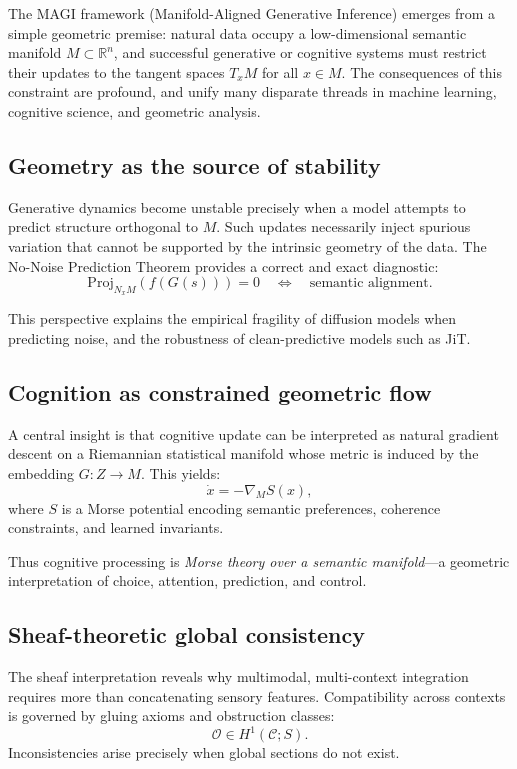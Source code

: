 \documentclass[11pt,a4paper,twocolumn]{article}
\begin{document}
The MAGI framework (Manifold-Aligned Generative Inference) emerges from
a simple geometric premise: natural data occupy a low-dimensional
semantic manifold $M \subset \mathbb{R}^n$, and successful generative or
cognitive systems must restrict their updates to the tangent spaces
$T_x M$ for all $x \in M$.  
The consequences of this constraint are profound, and unify many
disparate threads in machine learning, cognitive science, and geometric
analysis.

\subsection{Geometry as the source of stability}

Generative dynamics become unstable precisely when a model attempts to
predict structure orthogonal to $M$.  
Such updates necessarily inject spurious variation that cannot be
supported by the intrinsic geometry of the data.  
The No-Noise Prediction Theorem provides a correct and exact diagnostic:
\[
\mathrm{Proj}_{N_x M} (f(G(s))) = 0
\quad \Leftrightarrow \quad \text{semantic alignment}.
\]

This perspective explains the empirical fragility of diffusion models
when predicting noise, and the robustness of clean-predictive models
such as JiT.

\subsection{Cognition as constrained geometric flow}

A central insight is that cognitive update can be interpreted as natural
gradient descent on a Riemannian statistical manifold whose metric is
induced by the embedding $G : Z \to M$.  
This yields:
\[
\dot{x} = - \nabla_M S(x),
\]
where $S$ is a Morse potential encoding semantic preferences,
coherence constraints, and learned invariants.

Thus cognitive processing is 
\emph{Morse theory over a semantic manifold}—a geometric interpretation
of choice, attention, prediction, and control.

\subsection{Sheaf-theoretic global consistency}

The sheaf interpretation reveals why multimodal, multi-context
integration requires more than concatenating sensory features.  
Compatibility across contexts is governed by gluing axioms and
obstruction classes:
\[
\mathcal{O} \in H^1(\mathcal{C}; S).
\]
Inconsistencies arise precisely when global sections do not exist.
\end{document}
